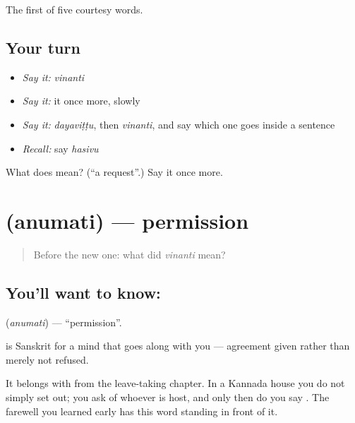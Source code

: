 \begin{grammarlens}[title={What you've built}]
The first of five courtesy words.
\end{grammarlens}

\subsection*{Your turn}
\begin{itemize}
\raggedright
  \item \emph{Say it:} \emph{vinanti}
  \item \emph{Say it:} it once more, slowly
  \item \emph{Say it:} \emph{dayaviṭṭu}, then \emph{vinanti}, and say which one goes inside a sentence
  \item \emph{Recall:} say \emph{hasivu}
\end{itemize}

\begin{tcolorbox}[breakable,colback=teal!4,colframe=teal!35!black,title={Before you move on}]
What does  mean? (\textquotedblleft{}a request\textquotedblright{}.) Say it once more.
\end{tcolorbox}
\section[\texorpdfstring{\kn{ಅನುಮತಿ} (anumati)}{ಅನುಮತಿ (anumati)}]{ (anumati) — permission}

\label{lesson:KA-C65-permission}



\begin{quote}
Before the new one: what did \emph{vinanti} mean?
\end{quote}

\subsection*{You'll want to know: }
\textbf{} (\emph{anumati}) — \textquotedblleft{}permission\textquotedblright{}.

 is Sanskrit for a mind that goes along with you — agreement given rather than merely not refused.

It belongs with  from the leave-taking chapter. In a Kannada house you do not simply set out; you ask  of whoever is host, and only then do you say  . The farewell you learned early has this word standing in front of it.

